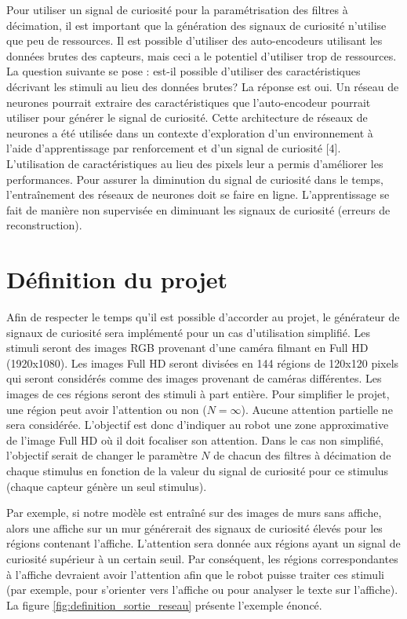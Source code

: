     Pour utiliser un signal de curiosité pour la paramétrisation des filtres à décimation, il est important que la génération des signaux de curiosité n’utilise que peu de ressources. Il est possible d’utiliser des auto-encodeurs utilisant les données brutes des capteurs, mais ceci a le potentiel d’utiliser trop de ressources. La question suivante se pose : est-il possible d’utiliser des caractéristiques décrivant les stimuli au lieu des données brutes? La réponse est oui. Un réseau de neurones pourrait extraire des caractéristiques que l’auto-encodeur pourrait utiliser pour générer le signal de curiosité. Cette architecture de réseaux de neurones a été utilisée dans un contexte d’exploration d’un environnement à l’aide d’apprentissage par renforcement et d’un signal de curiosité [4]. L’utilisation de caractéristiques au lieu des pixels leur a permis d’améliorer les performances. Pour assurer la diminution du signal de curiosité dans le temps, l’entraînement des réseaux de neurones doit se faire en ligne. L’apprentissage se fait de manière non supervisée en diminuant les signaux de curiosité (erreurs de reconstruction).

\section{Définition du projet}
    \label{sec:definition_projet}
    Afin de respecter le temps qu’il est possible d’accorder au projet, le générateur de signaux de curiosité sera implémenté pour un cas d’utilisation simplifié. Les stimuli seront des images RGB provenant d’une caméra filmant en  Full HD (1920x1080). Les images Full HD seront divisées en 144 régions de 120x120 pixels qui seront considérés comme des images provenant de caméras différentes. Les images de ces régions seront des stimuli à part entière. Pour simplifier le projet, une région peut avoir l’attention ou non (\(N = \infty\)). Aucune attention partielle ne sera considérée. L’objectif est donc d’indiquer au robot une zone approximative de l’image Full HD où il doit focaliser son attention. Dans le cas non simplifié, l’objectif serait de changer le paramètre \(N\) de chacun des filtres à décimation de chaque stimulus en fonction de la valeur du signal de curiosité pour ce stimulus (chaque capteur génère un seul stimulus).
    
    Par exemple, si notre modèle est entraîné sur des images de murs sans affiche, alors une affiche sur un mur générerait des signaux de curiosité élevés pour les régions contenant l’affiche. L’attention sera donnée aux régions ayant un signal de curiosité supérieur à un certain seuil. Par conséquent, les régions correspondantes à l’affiche devraient avoir l’attention afin que le robot puisse traiter ces stimuli (par exemple, pour s’orienter vers l’affiche ou pour analyser le texte sur l’affiche). La figure \ref{fig:definition_sortie_reseau} présente l’exemple énoncé. 
    
